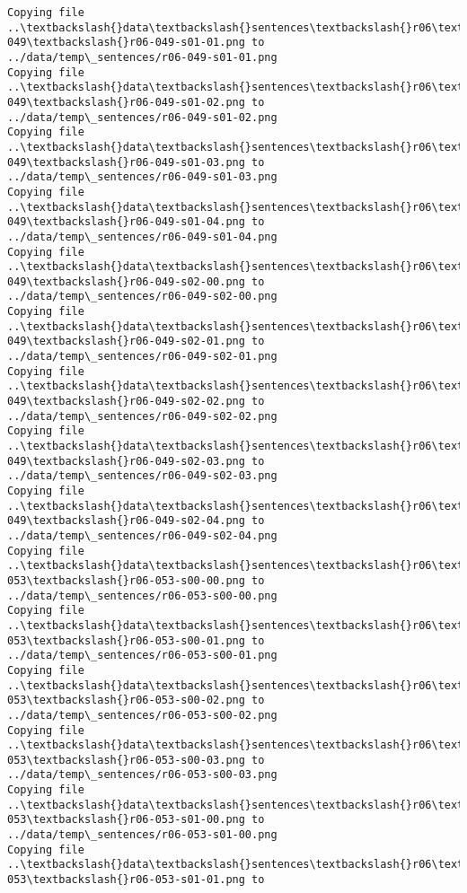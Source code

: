 \documentclass[11pt]{article}
\begin{document}
\begin{Verbatim}[commandchars=\\\{\}]
Copying file ..\textbackslash{}data\textbackslash{}sentences\textbackslash{}r06\textbackslash{}r06-049\textbackslash{}r06-049-s01-01.png to
../data/temp\_sentences/r06-049-s01-01.png
Copying file ..\textbackslash{}data\textbackslash{}sentences\textbackslash{}r06\textbackslash{}r06-049\textbackslash{}r06-049-s01-02.png to
../data/temp\_sentences/r06-049-s01-02.png
Copying file ..\textbackslash{}data\textbackslash{}sentences\textbackslash{}r06\textbackslash{}r06-049\textbackslash{}r06-049-s01-03.png to
../data/temp\_sentences/r06-049-s01-03.png
Copying file ..\textbackslash{}data\textbackslash{}sentences\textbackslash{}r06\textbackslash{}r06-049\textbackslash{}r06-049-s01-04.png to
../data/temp\_sentences/r06-049-s01-04.png
Copying file ..\textbackslash{}data\textbackslash{}sentences\textbackslash{}r06\textbackslash{}r06-049\textbackslash{}r06-049-s02-00.png to
../data/temp\_sentences/r06-049-s02-00.png
Copying file ..\textbackslash{}data\textbackslash{}sentences\textbackslash{}r06\textbackslash{}r06-049\textbackslash{}r06-049-s02-01.png to
../data/temp\_sentences/r06-049-s02-01.png
Copying file ..\textbackslash{}data\textbackslash{}sentences\textbackslash{}r06\textbackslash{}r06-049\textbackslash{}r06-049-s02-02.png to
../data/temp\_sentences/r06-049-s02-02.png
Copying file ..\textbackslash{}data\textbackslash{}sentences\textbackslash{}r06\textbackslash{}r06-049\textbackslash{}r06-049-s02-03.png to
../data/temp\_sentences/r06-049-s02-03.png
Copying file ..\textbackslash{}data\textbackslash{}sentences\textbackslash{}r06\textbackslash{}r06-049\textbackslash{}r06-049-s02-04.png to
../data/temp\_sentences/r06-049-s02-04.png
Copying file ..\textbackslash{}data\textbackslash{}sentences\textbackslash{}r06\textbackslash{}r06-053\textbackslash{}r06-053-s00-00.png to
../data/temp\_sentences/r06-053-s00-00.png
Copying file ..\textbackslash{}data\textbackslash{}sentences\textbackslash{}r06\textbackslash{}r06-053\textbackslash{}r06-053-s00-01.png to
../data/temp\_sentences/r06-053-s00-01.png
Copying file ..\textbackslash{}data\textbackslash{}sentences\textbackslash{}r06\textbackslash{}r06-053\textbackslash{}r06-053-s00-02.png to
../data/temp\_sentences/r06-053-s00-02.png
Copying file ..\textbackslash{}data\textbackslash{}sentences\textbackslash{}r06\textbackslash{}r06-053\textbackslash{}r06-053-s00-03.png to
../data/temp\_sentences/r06-053-s00-03.png
Copying file ..\textbackslash{}data\textbackslash{}sentences\textbackslash{}r06\textbackslash{}r06-053\textbackslash{}r06-053-s01-00.png to
../data/temp\_sentences/r06-053-s01-00.png
Copying file ..\textbackslash{}data\textbackslash{}sentences\textbackslash{}r06\textbackslash{}r06-053\textbackslash{}r06-053-s01-01.png to

\end{Verbatim}
\end{document}
